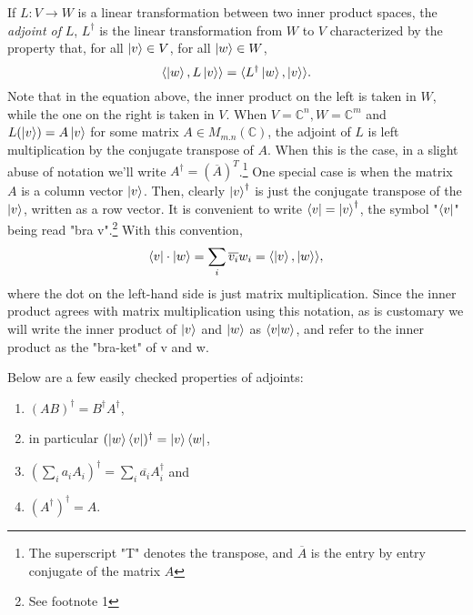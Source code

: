 If $L:V \to W$ is a linear transformation between two inner product spaces, the {\emph{adjoint of }}$L$, $L^\dagger$ is the linear transformation from $W$ to $V$ characterized by the property that, \textrm{ for all } $\ket{v} \in V$, \textrm{ for all }$\ket{w} \in W$, 
\begin{equation}
    \langle\ket{w}, L\ket{v}\rangle=\langle L^\dagger \ket{w}, \ket{v}\rangle .
\end{equation}
Note that in the equation above, the inner product on the left is taken in $W$, while the one on the right is taken in $V$.  When $V={\mathbb{C}}^n, W={\mathbb{C}}^m$ and $L(\ket{v})=A\ket{v}$ for some matrix $A \in M_{m.n}(\mathbb{C})$, the adjoint of $L$ is left multiplication by the conjugate transpose of $A$.  When this is the case, in a slight abuse of notation we'll write $A^\dagger=(\overline{A})^T$.\footnote{The superscript "T" denotes the transpose, and $\overline{A}$ is the entry by entry conjugate of the matrix $A$} One special case is when the matrix $A$ is a column vector $\ket{v}$.  Then, clearly $\ket{v}^\dagger$ is just the conjugate transpose of the $\ket{v}$, written as a row vector.  It is convenient to write $\bra{v}={\ket{v}}^\dagger$, the symbol "$\bra{v}$" being read "bra v".\footnote{See footnote 1}  With this convention,
\begin{equation}
\bra{v}\cdot \ket{w}=\sum_i \overline{v_i}w_i=\langle \ket{v},\ket{w}\rangle,
\end{equation}
where the dot on the left-hand side is just matrix multiplication.  Since the inner product agrees with matrix multiplication using this notation, as is customary we will write the inner product of $\ket{v}$ and $\ket{w}$ as $\braket{v|w}$, and refer to the inner product as the "bra-ket" of v and w.

Below are a few easily checked properties of adjoints:
\begin{enumerate}
    \item $(AB)^\dagger=B^\dagger A^\dagger$,
    \item in particular $(\ket{w}\bra{v})^\dagger=\ket{v}\bra{w}$,
    \item $(\sum_i a_i A_i)^\dagger=\sum_i \overline{a_i} A_i^\dagger$ and 
    \item $(A^\dagger)^\dagger=A$.
\end{enumerate}

